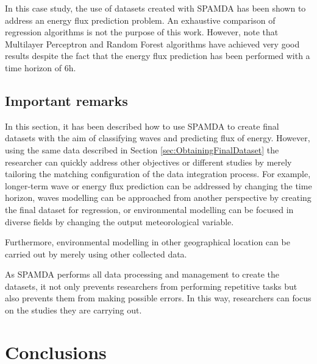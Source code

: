 \documentclass[energies,article,submit,moreauthors,pdftex]{Definitions/mdpi}
\begin{document}
			In this case study, the use of datasets created with SPAMDA has been shown to address an energy flux prediction problem. An exhaustive comparison of regression algorithms is not the purpose of this work. However, note that Multilayer Perceptron and Random Forest algorithms have achieved very good results despite the fact that the energy flux prediction has been performed with a time horizon of 6h.

		\subsection{Important remarks}
		
			In this section, it has been described how to use SPAMDA to create final datasets with the aim of classifying waves and predicting flux of energy. However, using the same data described in Section \ref{sec:ObtainingFinalDataset} the researcher can quickly address other objectives or different studies by merely tailoring the matching configuration of the data integration process. For example, longer-term wave or energy flux prediction can be addressed by changing the time horizon, waves modelling can be approached from another perspective by creating the final dataset for regression, or environmental modelling can be focused in diverse fields by changing the output meteorological variable.

			Furthermore, environmental modelling in other geographical location can be carried out by merely using other collected data.
			
			As SPAMDA performs all data processing and management to create the datasets, it not only prevents researchers from performing repetitive tasks but also prevents them from making possible errors. In this way, researchers can focus on the studies they are carrying out.
		
	\section{Conclusions}\label{sec:Conclusions}

		
\end{document}
